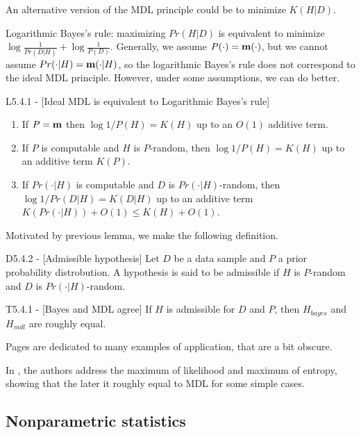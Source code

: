\documentclass{article}
\begin{document}
 An alternative version of the MDL principle could be to minimize $K(H|D)$.

 Logarithmic Bayes's rule: maximizing $Pr(H|D)$ is equivalent to minimize $\log \frac{1}{Pr(D|H)} + \log \frac{1}{P(D)}$. Generally, we assume $P(\cdot) = {\bf m}(\cdot)$, but we cannot assume $Pr(\cdot|H) = {\bf m}(\cdot|H)$, so the logarithmic Bayes's rule does not correspond to the ideal MDL principle. However, under some assumptions, we can do better.

\begin{flexilemma}{L5.4.1 - }[Ideal MDL is equivalent to Logarithmic Bayes's rule]
    \begin{enumerate}[label = (\roman*)]
        \item If $P = {\bf m}$ then $\log 1/P(H) = K(H)$ up to an $O(1)$ additive term.
        \item If $P$ is computable and $H$ is $P$-random, then $\log 1/P(H) = K(H)$ up to an additive term $K(P)$.
        \item If $Pr(\cdot|H)$ is computable and $D$ is $Pr(\cdot|H)$-random, then $\log 1/Pr(D|H) = K(D|H)$ up to an additive term $K(Pr(\cdot|H))+O(1) \leq K(H) + O(1)$.
    \end{enumerate}
\end{flexilemma}

Motivated by previous lemma, we make the following definition.

\begin{flexidefinition}{D5.4.2 - }[Admissible hypothesis]
    Let $D$ be a data sample and $P$ a prior probability distrobution. A hypothesis is said to be admissible if $H$ is $P$-random and $D$ is $Pr(\cdot|H)$-random.
\end{flexidefinition}

\begin{flexitheorem}{T5.4.1 - }[Bayes and MDL agree]
    If $H$ is admissible for $D$ and $P$, then $H_{bayes}$ and $H_{mdl}$ are roughly equal.
\end{flexitheorem}

Pages  are dedicated to many examples of application, that are a bit obscure.

In , the authors address the maximum of likelihood and maximum of entropy, showing that the later it roughly equal to MDL for some simple cases.

\subsection{Nonparametric statistics}
\end{document}
